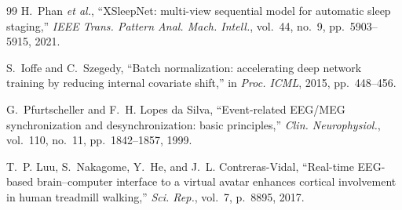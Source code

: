 \documentclass[conference]{IEEEtran}
\begin{document}
\begin{thebibliography}{99}
 H.~Phan \emph{et al.}, ``XSleepNet: multi-view sequential
model for automatic sleep staging,'' \emph{IEEE Trans. Pattern Anal. Mach.
Intell.}, vol.~44, no.~9, pp.~5903--5915, 2021.

 S.~Ioffe and C.~Szegedy, ``Batch normalization: accelerating
deep network training by reducing internal covariate shift,'' in \emph{Proc.
ICML}, 2015, pp.~448--456.

 G.~Pfurtscheller and F.~H. Lopes da Silva, ``Event-related EEG/MEG
synchronization and desynchronization: basic principles,'' \emph{Clin.
Neurophysiol.}, vol.~110, no.~11, pp.~1842--1857, 1999.

 T.~P. Luu, S.~Nakagome, Y.~He, and J.~L. Contreras-Vidal,
``Real-time EEG-based brain--computer interface to a virtual avatar enhances
cortical involvement in human treadmill walking,'' \emph{Sci. Rep.}, vol.~7,
p.~8895, 2017.
\end{thebibliography}
\end{document}
